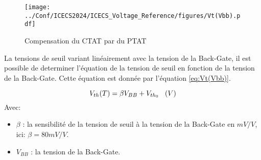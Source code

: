 \begin{figure}
    \centering
    \texttt{[image: ../Conf/ICECS2024/ICECS\_Voltage\_Reference/figures/Vt(Vbb).pdf]}
    \caption{Compensation du CTAT par du PTAT}
    \label{fig:CTAT_PTAT_insh}
\end{figure}

La tensions de seuil variant linéairement avec la tension de la Back-Gate, il est possible de determiner l'équation de la tension de seuil en fonction de la tension de la Back-Gate. Cette équation est donnée par l'équation \ref{eq:Vt(Vbb)}.

\begin{equation}
    V_{th}(T) = \beta V_{BB} + V_{th_0}\hspace*{0.3cm}(V)
    \label{eq:Vt(Vbb)}
\end{equation}
Avec:

\begin{itemize}
    \item $\beta$ : la sensibilité de la tension de seuil à la tension de la Back-Gate en $mV/V$, ici: $\beta=80mV/V$.
    \item $V_{BB}$ : la tension de la Back-Gate.
\end{itemize}
